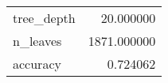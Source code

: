 \begin{tabular}{lr}
\toprule
 &  \\
\midrule
tree\_depth & 20.000000 \\
n\_leaves & 1871.000000 \\
accuracy & 0.724062 \\
\bottomrule
\end{tabular}